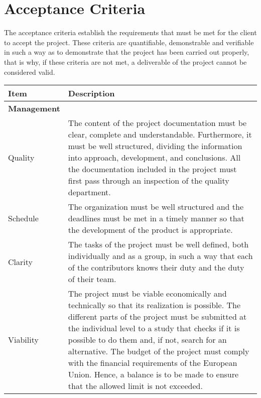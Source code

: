 \section{Acceptance Criteria}

The acceptance criteria establish the requirements that must be met for the client to accept the project. These criteria are quantifiable, demonstrable and verifiable in such a way as to demonstrate that the project has been carried out properly, that is why, if these criteria are not met, a deliverable of the project cannot be considered valid.

\begin{longtable}[H]{lp{10.2cm}}
	
	\toprule[2pt]
	
	\textbf{Item} & \textbf{Description} \\
	
	\midrule[1.5pt] 
	\endhead
	
	\textbf{Management} & \vspace{0.2cm} \\
	
	\midrule[1.5pt]
	
	Quality & The content of the project documentation must be clear, complete and understandable. Furthermore, it must be well structured, dividing the information into approach, development, and conclusions.\vspace{0.2cm}
	\newline
	All the documentation included in the project must first pass through an inspection of the quality department.\vspace{0.2cm} \\
	
	\midrule	
	
	Schedule & The organization must be well structured and the deadlines must be met in a timely manner so that the development of the product is appropriate.\vspace{0.2cm} \\
	
	\midrule
	
	Clarity & The tasks of the project must be well defined, both individually and as a group, in such a way that each of the contributors knows their duty and the duty of their team.\vspace{0.2cm} \\
	
	\midrule
	
	Viability & The project must be viable economically and technically so that its realization is possible.\vspace{0.2cm}
	\newline
	The different parts of the project must be submitted at the individual level to a study that checks if it is possible to do them and, if not, search for an alternative.\vspace{0.2cm}
	\newline
	The budget of the project must comply with the financial requirements of the European Union. Hence, a balance is to be made to ensure that the allowed limit is not exceeded.\vspace{0.2cm}\\
	

\end{longtable}
